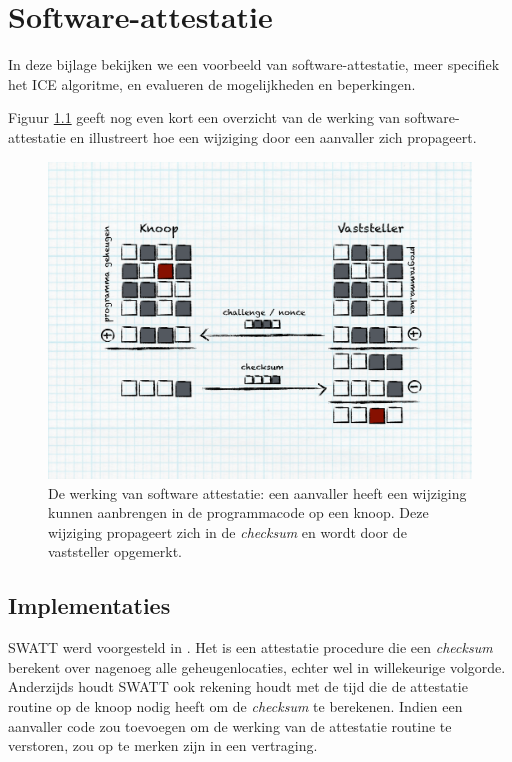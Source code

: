 
\chapter{Software-attestatie}
\label{appendix:attestation}

In deze bijlage bekijken we een voorbeeld van software-attestatie, meer
specifiek het ICE algoritme, en evalueren de mogelijkheden en beperkingen.

Figuur \ref{fig:attestation-process} geeft nog even kort een overzicht van de
werking van software-attestatie en illustreert hoe een wijziging door een
aanvaller zich propageert.

\begin{figure}[ht]
  \centering
  \includegraphics[width=0.9\linewidth]{resources/attestation-process.pdf}
  \caption[De werking van software-attestatie]{De werking van software
  attestatie: een aanvaller heeft een wijziging kunnen aanbrengen in de
  programmacode op een knoop. Deze wijziging propageert zich in de
  \emph{checksum} en wordt door de vaststeller opgemerkt.}
  \label{fig:attestation-process}
\end{figure}

\section{Implementaties}

SWATT werd voorgesteld in \citep{seshadri2004swatt}. Het is een attestatie
procedure die een \emph{checksum} berekent over nagenoeg alle geheugenlocaties,
echter wel in willekeurige volgorde. Anderzijds houdt SWATT ook rekening houdt
met de tijd die de attestatie routine op de knoop nodig heeft om de
\emph{checksum} te berekenen. Indien een aanvaller code zou toevoegen om de
werking van de attestatie routine te verstoren, zou op te merken zijn in een
vertraging.

